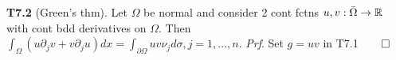{\bf T7.2} (Green's thm). Let $\Omega$ be normal and consider 2 cont fctns $u, v: \bar{\Omega} \rightarrow \mathbb{R}$ with cont bdd derivatives on $\Omega$. Then $\int_{\Omega} (u \partial_j v + v \partial_j u)dx = \int_{\partial \Omega} uv \nu_j d\sigma, j = 1, \dots, n$. {\it Prf}. Set $g = uv$ in T7.1$\qed$
